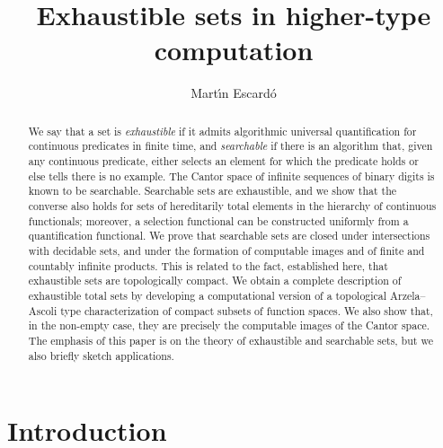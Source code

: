 \documentclass{LMCS}
\begin{document}
\author[M.~Escard\'o]{Mart\'\i n Escard\'o}
\address{School of Computer Science, University of Birmingham, B15 2TT, UK}

\title[Exhaustible sets]{Exhaustible sets in higher-type computation}



\begin{abstract}
  We say that a set is \emph{exhaustible} if it admits algorithmic
  universal quantification for continuous predicates in finite time,
  and \emph{searchable} if there is an algorithm that, given any
  continuous predicate, either selects an element for which the
  predicate holds or else tells there is no example.  The Cantor space
  of infinite sequences of binary digits is known to be searchable.
  Searchable sets are exhaustible, and we show that the converse also
  holds for sets of hereditarily total elements in the hierarchy of
  continuous functionals; moreover, a selection functional can be
  constructed uniformly from a quantification functional.  We prove
  that searchable sets are closed under intersections with decidable
  sets, and under the formation of computable images and of finite and
  countably infinite products.  This is related to the fact,
  established here, that exhaustible sets are topologically compact.
  We obtain a complete description of exhaustible total sets by
  developing a computational version of a topological Arzela--Ascoli
  type characterization of compact subsets of function spaces. We also
  show that, in the non-empty case, they are precisely the computable
  images of the Cantor space. The emphasis of this paper is on the
  theory of exhaustible and searchable sets, but we also briefly
  sketch applications. 
\end{abstract}

\maketitle

\section{Introduction}
\end{document}

